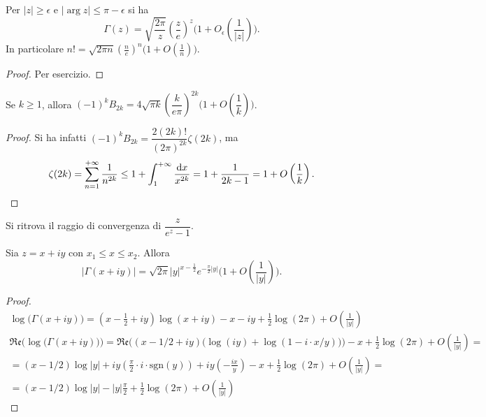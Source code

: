 \begin{cor} \label{gammaord}
  Per $|z| \ge \epsilon$ e $|\arg{z}| \le \pi-\epsilon$ si ha
  $$\Gamma(z)=\sqrt{\frac{2\pi}{z}}\left(\frac{z}{e}\right)^z\Bigg(1+O_{\epsilon}\left(\frac{1}{|z|}\right)\Bigg).$$
  In particolare $\displaystyle n!=\sqrt{2\pi n}\left(\frac{n}{e}\right)^n\Bigg(1+O\left(\frac{1}{n}\right)\Bigg)$.
\end{cor}

\begin{proof}
  Per esercizio.
\end{proof}

\begin{cor}
  Se $k \ge 1$, allora $(-1)^kB_{2k}=4\sqrt{\pi k}\left(\dfrac{k}{e\pi}\right)^{2k}\Bigg(1+O\left(\dfrac{1}{k}\right)\Bigg)$.
\end{cor}

\begin{proof}
  Si ha infatti $(-1)^kB_{2k}=\dfrac{2(2k)!}{(2\pi)^{2k}}\zeta(2k)$, ma
  $$\zeta(2k)=\sum_{n=1}^{+\infty} \frac{1}{n^{2k}} \le 1+\int_1^{+\infty} \frac{\mathop{}\!\mathrm{d} x}{x^{2k}}=1+\frac{1}{2k-1}=1+O\left(\frac{1}{k}\right).$$
\end{proof}

\begin{oss}
  Si ritrova il raggio di convergenza di $\dfrac{z}{e^z-1}$.
\end{oss}

\begin{cor}
  Sia $z=x+iy$ con $x_1 \le x \le x_2$. Allora
  $$\left|\Gamma(x+iy)\right|=\sqrt{2\pi}|y|^{x-\frac{1}{2}}e^{-\frac{\pi}{2}|y|}\Bigg(1+O\left(\frac{1}{|y|}\right)\Bigg).$$
\end{cor}

\begin{proof}
  \begin{gather*}
    \log\big(\Gamma(x+iy)\big)=\left(x-\frac{1}{2}+iy\right)\log(x+iy)-x-iy+\frac{1}{2}\log(2\pi)+O\left(\frac{1}{|y|}\right) \\
    \mathfrak{Re}\Big(\log\big(\Gamma(x+iy)\big)\Big)=\mathfrak{Re}\Big((x-1/2+iy)\big(\log(iy)+\log(1-i\cdot x/y)\big)\Big)-x+\frac{1}{2}\log(2\pi)+O\left(\frac{1}{|y|}\right)= \\
    =(x-1/2)\log|y|+iy\left(\frac{\pi}{2}\cdot i\cdot\text{sgn}(y)\right)+iy\left(-\frac{ix}{y}\right)-x+\frac{1}{2}\log(2\pi)+O\left(\frac{1}{|y|}\right)=\\
    =(x-1/2)\log|y|-|y|\frac{\pi}{2}+\frac{1}{2}\log(2\pi)+O\left(\frac{1}{|y|}\right)
  \end{gather*}
\end{proof}
